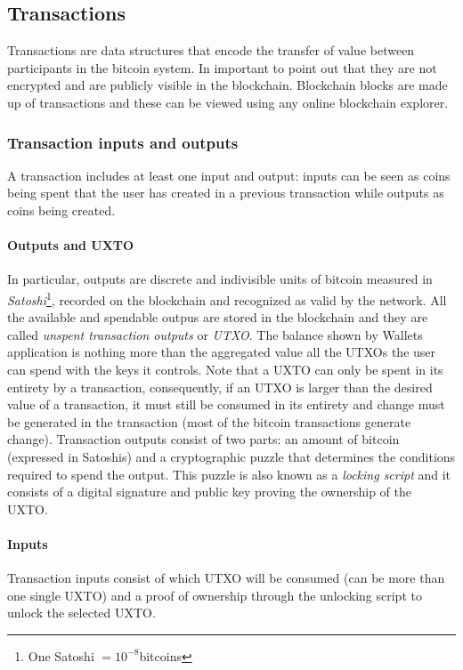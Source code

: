 \subsection{Transactions}\label{sec:transactions} Transactions are data structures that encode the
transfer of value between participants in the bitcoin system. In important to
point out that they are not encrypted and are publicly visible in the
blockchain. Blockchain blocks are made up of transactions and these can be
viewed using any online blockchain explorer.

\subsubsection{Transaction inputs and outputs}
A transaction includes at least one input and output: inputs can be seen as
coins being spent that the user has created in a previous transaction while
outputs as coins being created.

\paragraph{Outputs and UXTO} In particular, outputs are discrete and indivisible
units of bitcoin measured in \emph{Satoshi}\footnote{One Satoshi
$=10^{-8}$bitcoins}, recorded on the blockchain and recognized as valid by the
network. All the available and spendable outpus are stored in the blockchain and
they are called \emph{unspent transaction outputs} or \emph{UTXO}. The balance
shown by Wallets application is nothing more than the aggregated value all the
UTXOs the user can spend with the keys it controls. Note that a UXTO can only be
spent in its entirety by a transaction, consequently, if an UTXO is larger than
the desired value of a transaction, it must still be consumed in its entirety
and change must be generated in the transaction (most of the bitcoin
transactions generate change). Transaction outputs consist of two parts: an
amount of bitcoin (expressed in Satoshis) and a cryptographic puzzle that
determines the conditions required to spend the output. This puzzle is also
known as a \emph{locking script} and it consists of a digital signature and
public key proving the ownership of the UXTO.

\paragraph{Inputs} Transaction inputs consist of which UTXO will be consumed
(can be more than one single UXTO) and a proof of ownership through the
unlocking script to unlock the selected UXTO.


